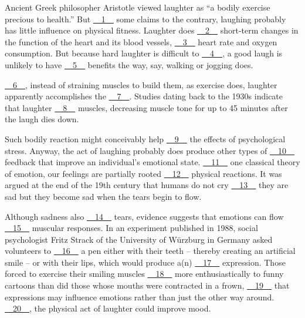 Ancient Greek philosopher Aristotle viewed laughter as ``a bodily exercise precious to health.'' But \uline{~~1~~} some claims to the contrary, laughing probably has  little influence on physical fitness. Laughter does \uline{~~2~~} short-term changes in the function of the heart and its blood vessels, \uline{~~3~~} heart rate and oxygen consumption. But because hard laughter is difficult to \uline{~~4~~}, a good laugh is  unlikely to have \uline{~~5~~} benefits the way, say, walking or jogging does.


\uline{~~6~~}, instead of straining muscles to build them, as exercise does, laughter apparently accomplishes the \uline{~~7~~}. Studies dating back to the 1930s indicate that laughter \uline{~~8~~} muscles, decreasing muscle tone for up to 45 minutes after the laugh dies down.


Such bodily reaction might conceivably help \uline{~~9~~} the effects of psychological stress. Anyway, the act of laughing probably does produce other types of \uline{~~10~~} feedback that improve an individual's emotional state. \uline{~~11~~} one classical theory of emotion, our feelings are partially rooted \uline{~~12~~} physical reactions. It was argued at the end of the 19th century that humans do not cry \uline{~~13~~} they are sad but they become sad when the tears begin to flow.


Although sadness also \uline{~~14~~} tears, evidence suggests that emotions can flow \uline{~~15~~} muscular responses. In an experiment published in 1988, social psychologist Fritz Strack of the University of Würzburg in Germany asked volunteers to \uline{~~16~~} a pen either with their teeth – thereby creating an artificial smile – or with their lips, which would produce a(n) \uline{~~17~~} expression. Those forced to exercise  their smiling muscles \uline{~~18~~} more enthusiastically to funny cartoons than did those whose mouths were contracted in a frown, \uline{~~19~~} that expressions may influence emotions rather than just the other way around. \uline{~~20~~}, the physical act of laughter could improve mood.